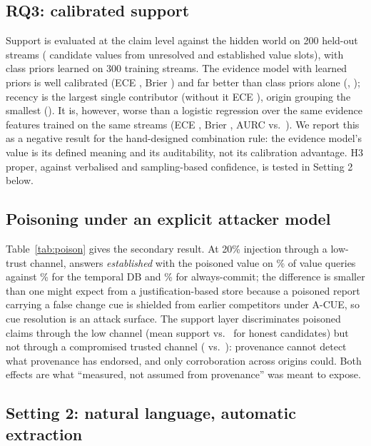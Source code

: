 \subsection{RQ3: calibrated support}

Support is evaluated at the claim level against the hidden world on 200 held-out streams (\RqN{} candidate values from unresolved and established value slots), with class priors learned on 300 training streams. The evidence model with learned priors is well calibrated (ECE \RqLearnedEce, Brier \RqLearnedBrier) and far better than class priors alone (\RqPriorEce, \RqPriorBrier); recency is the largest single contributor (without it ECE \RqNoRecEce), origin grouping the smallest (\RqNoOrigEce). It is, however, worse than a logistic regression over the same evidence features trained on the same streams (ECE \RqLogregEce, Brier \RqLogregBrier, AURC \RqLogregAurc{} vs.\ \RqLearnedAurc). We report this as a negative result for the hand-designed combination rule: the evidence model's value is its defined meaning and its auditability, not its calibration advantage. H3 proper, against verbalised and sampling-based confidence, is tested in Setting 2 below.

\subsection{Poisoning under an explicit attacker model}

Table~\ref{tab:poison} gives the secondary result. At 20\% injection through a low-trust channel, \pal{} answers \emph{established} with the poisoned value on \PoisHarmPal\% of value queries against \PoisHarmTdb\% for the temporal DB and \PoisHarmCommit\% for always-commit; the difference is smaller than one might expect from a justification-based store because a poisoned report carrying a false change cue is shielded from earlier competitors under A-CUE, so cue resolution is an attack surface. The support layer discriminates poisoned claims through the low channel (mean support \PoisSupLowPois{} vs.\ \PoisSupLowHon{} for honest candidates) but not through a compromised trusted channel (\PoisSupTrPois{} vs.\ \PoisSupTrHon): provenance cannot detect what provenance has endorsed, and only corroboration across origins could. Both effects are what ``measured, not assumed from provenance'' was meant to expose.

\subsection{Setting 2: natural language, automatic extraction}

